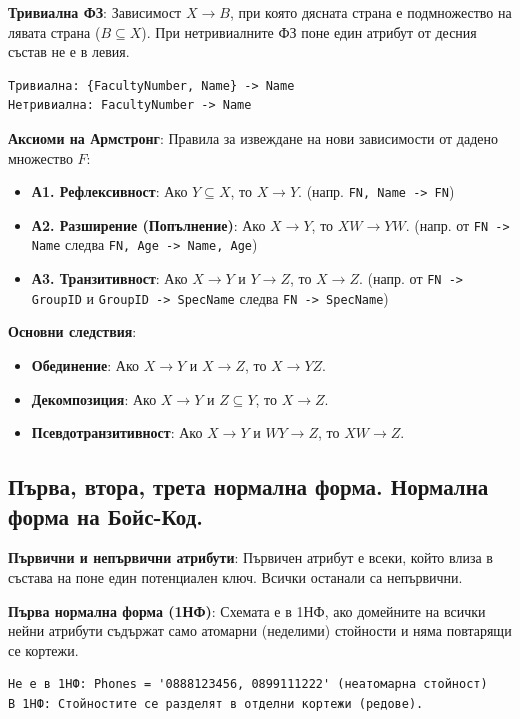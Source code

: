 \documentclass{article}
\renewcommand{\\}{\newline}
\begin{document}
\textbf{Тривиална ФЗ}: Зависимост $X \rightarrow B$, при която дясната страна е подмножество на лявата страна ($B \subseteq X$). При нетривиалните ФЗ поне един атрибут от десния състав не е в левия.
\begin{verbatim}
Тривиална: {FacultyNumber, Name} -> Name
Нетривиална: FacultyNumber -> Name
\end{verbatim}

\textbf{Аксиоми на Армстронг}: Правила за извеждане на нови зависимости от дадено множество $F$:
\begin{itemize}
\item \textbf{А1. Рефлексивност}: Ако $Y \subseteq X$, то $X \rightarrow Y$. (напр. \texttt{{FN, Name} -> FN})
\item \textbf{А2. Разширение (Попълнение)}: Ако $X \rightarrow Y$, то $XW \rightarrow YW$. (напр. от \texttt{FN -> Name} следва \texttt{{FN, Age} -> {Name, Age}})
\item \textbf{А3. Транзитивност}: Ако $X \rightarrow Y$ и $Y \rightarrow Z$, то $X \rightarrow Z$. (напр. от \texttt{FN -> GroupID} и \texttt{GroupID -> SpecName} следва \texttt{FN -> SpecName})
\end{itemize}

\textbf{Основни следствия}:
\begin{itemize}
\item \textbf{Обединение}: Ако $X \rightarrow Y$ и $X \rightarrow Z$, то $X \rightarrow YZ$.
\item \textbf{Декомпозиция}: Ако $X \rightarrow Y$ и $Z \subseteq Y$, то $X \rightarrow Z$.
\item \textbf{Псевдотранзитивност}: Ако $X \rightarrow Y$ и $WY \rightarrow Z$, то $XW \rightarrow Z$.
\end{itemize}

\subsection{Първа, втора, трета нормална форма. Нормална форма на Бойс-Код.}

\textbf{Първични и непървични атрибути}: Първичен атрибут е всеки, който влиза в състава на поне един потенциален ключ. Всички останали са непървични.

\textbf{Първа нормална форма (1НФ)}: Схемата е в 1НФ, ако домейните на всички нейни атрибути съдържат само атомарни (неделими) стойности и няма повтарящи се кортежи.
\begin{verbatim}
Не е в 1НФ: Phones = '0888123456, 0899111222' (неатомарна стойност)
В 1НФ: Стойностите се разделят в отделни кортежи (редове).
\end{verbatim}
\end{document}
